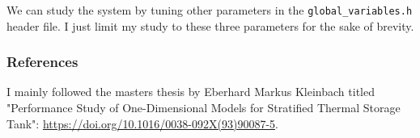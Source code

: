 \documentclass{article}
\begin{document}
We can study the system by tuning other parameters in the \texttt{global\_variables.h} header file. I just limit my study to these three parameters for the sake of brevity. 


\subsubsection*{References}
I mainly followed the masters thesis by Eberhard Markus Kleinbach titled "Performance Study of One-Dimensional Models for Stratified Thermal Storage Tank": \url{https://doi.org/10.1016/0038-092X(93)90087-5}.
\end{document}

